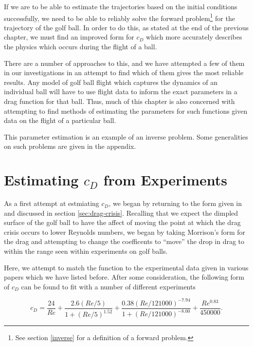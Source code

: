 If we are to be able to estimate the trajectories based on the initial conditions successfully, we
need to be able to reliably solve the forward problem\footnote{See section \ref{inverse} for a definition
of a forward problem.} for the trajectory of the golf ball. In order
to do this, as stated at the end of the previous chapter, we must find an improved form for $c_D$ which
more accurately describes the physics which occurs during the flight of a ball.

There are a number of approaches to this, and we have attempted a few of them in our investigations
in an attempt to find which of them gives the most reliable results. Any model of golf ball flight which
captures the dynamics of an individual ball will have to use flight data to inform the exact parameters
in a drag function for that ball. Thus, much of this chapter is also concerned with attempting to find 
methods of estimating the parameters for such functions given data on the flight of a particular ball.

This parameter estimation is an example of an inverse problem. Some generalities on such problems are
given in the appendix.

\section{Estimating $c_{D}$ from Experiments}

As a first attempt at estmiating $c_D$, we began by returning to the form given in \citet{Morrison2010}
and discussed in section \ref{sec:drag-crisis}. Recalling that we expect the dimpled surface of the
golf ball to have the affect of moving the point at which the drag crisis occurs to lower Reynolds
numbers, we began by taking Morrison's form for the drag and attempting to change the coefficents to
``move'' the drop in drag to within the range seen within experiments on golf balls.

Here, we attempt to match the function to the experimental data given in various papers which we
have listed before. After some consideration, the following form of $c_D$ can be found to fit
with a number of different experiments

\begin{equation} \label{drag-m-mod}
c_D = \frac{24}{Re} + \frac{2.6(Re/5)}{1 + (Re/5)^{1.52}} + \frac{0.38(Re/121000)^{-7.94}}{1+(Re/121000)^{-8.00}}
+ \frac{Re^{0.83}}{450000} .
\end{equation}

